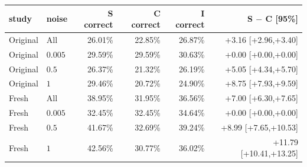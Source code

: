 \begin{tabular}{@{}llrrrr@{}}
\toprule
 study & noise & S correct & C correct & I correct & S $-$ C [95\%]\\
\midrule
Original & All & 26.01\% & 22.85\% & 26.87\% & +3.16 [+2.96,+3.40]\\
Original & $0.005$ & 29.59\% & 29.59\% & 30.63\% & +0.00 [+0.00,+0.00]\\
Original & $0.5$ & 26.37\% & 21.32\% & 26.19\% & +5.05 [+4.34,+5.70]\\
Original & $1$ & 29.46\% & 20.72\% & 24.90\% & +8.75 [+7.93,+9.59]\\
Fresh & All & 38.95\% & 31.95\% & 36.56\% & +7.00 [+6.30,+7.65]\\
Fresh & $0.005$ & 32.45\% & 32.45\% & 34.64\% & +0.00 [+0.00,+0.00]\\
Fresh & $0.5$ & 41.67\% & 32.69\% & 39.24\% & +8.99 [+7.65,+10.53]\\
Fresh & $1$ & 42.56\% & 30.77\% & 36.02\% & +11.79 [+10.41,+13.25]\\
\bottomrule
\end{tabular}

